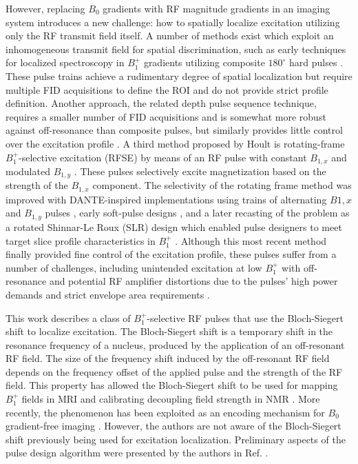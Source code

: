 \documentclass{article}
\begin{document}
\par However, replacing $B_0$ gradients with RF magnitude gradients in an imaging system introduces a new challenge: 
how to spatially localize excitation utilizing only the RF transmit field itself. 
A number of methods exist which exploit an inhomogeneous transmit field for spatial discrimination, 
such as early techniques for localized spectroscopy in $B_1^+$ gradients utilizing composite $180^\circ$ hard pulses \cite{Tycko1984SpatialInversion, Shaka1984SpatiallyPulses}. 
These pulse trains achieve a rudimentary degree of spatial localization but require multiple FID acquisitions to define the ROI and do not provide strict profile definition. 
Another approach, the related depth pulse sequence technique, 
requires a smaller number of FID acquisitions and is somewhat more robust against off-resonance than composite pulses, 
but similarly provides little control over the excitation profile \cite{Bendall1983DepthCoils}. 
A third method proposed by Hoult is rotating-frame $B_1^+$-selective excitation (RFSE) 
by means of an RF pulse with constant $B_{1,x}$ and modulated $B_{1,y}$ \cite{Hoult1980NMRPulses}. 
These pulses selectively excite magnetization based on the strength of the $B_{1,x}$ component. 
The selectivity of the rotating frame method was improved with DANTE-inspired implementations using trains of alternating $B{1,x}$ and $B_{1,y}$ pulses \cite{Karczmar1988ShapedSimulations,Maffei1991SliceCoil}, 
early soft-pulse designs \cite{Hedges1988TheResults}, 
and a later recasting of the problem as a rotated Shinnar-Le Roux (SLR) design which enabled 
pulse designers to meet target slice profile characteristics in $B_1^+$ \cite{Grissom2014B1+-selectiveAlgorithm}. 
Although this most recent method finally provided fine control of the excitation profile, 
these pulses suffer from a number of challenges, 
including unintended excitation at low $B_1^+$ with off-resonance and potential RF amplifier distortions due to the pulses' high power demands and strict envelope area requirements \cite{Grissom2014B1+-selectiveAlgorithm}. 

\par This work describes a class of $B_1^+$-selective RF pulses that use the Bloch-Siegert shift \cite{Bloch1940MagneticFields} to localize excitation. 
The Bloch-Siegert shift is a temporary shift in the resonance frequency of a nucleus, produced by the application of an off-resonant RF field. 
The size of the frequency shift induced by the off-resonant RF field depends on the frequency offset of the applied pulse and the strength of the RF field. 
This property has allowed the Bloch-Siegert shift to be used for mapping $B_1^+$ fields in MRI \cite{Sacolick2010B1Shift} and calibrating decoupling field strength in NMR \cite{Hosur1983AShifts,Hung2020UsingSample}. More recently, the phenomenon has been exploited as an encoding mechanism for $B_0$ gradient-free imaging \cite{Kartausch2014SpatialEffect, Zhipeng2014FrequencyShift, Wan2017PhaseTransmit}. However, the authors are not aware of the Bloch-Siegert shift previously being used for excitation localization. Preliminary aspects of the pulse design algorithm were presented by the authors in Ref. \cite{Martin2021Bloch-SiegertPulses}.
\end{document}
